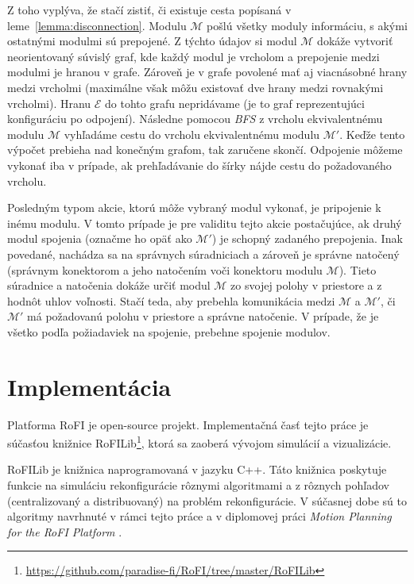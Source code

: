 \documentclass[
  digital, %
  oneside, %
  notable,   %
  lof,     %
  nolot,     %
]{fithesis3}
\begin{document}
Z toho vyplýva, že stačí zistiť, či existuje cesta popísaná v leme~\ref{lemma:disconnection}. Modulu $\mathcal{M}$ pošlú všetky moduly informáciu, s akými ostatnými modulmi sú prepojené. Z týchto údajov si modul $\mathcal{M}$ dokáže vytvoriť neorientovaný súvislý graf, kde každý modul je vrcholom a prepojenie medzi modulmi je hranou v grafe. Zároveň je v grafe povolené mať aj viacnásobné hrany medzi vrcholmi (maximálne však môžu existovať dve hrany medzi rovnakými vrcholmi). Hranu $\mathcal{E}$ do tohto grafu nepridávame (je to graf reprezentujúci konfiguráciu po odpojení). Následne pomocou \textit{BFS} z vrcholu ekvivalentnému modulu $\mathcal{M}$ vyhľadáme cestu do vrcholu ekvivalentnému modulu $\mathcal{M}'$. Keďže tento výpočet prebieha nad konečným grafom, tak zaručene skončí. Odpojenie môžeme vykonať iba v prípade, ak prehľadávanie do šírky nájde cestu do požadovaného vrcholu. 

Posledným typom akcie, ktorú môže vybraný modul vykonať, je pripojenie k inému modulu. V tomto prípade je pre validitu tejto akcie postačujúce, ak druhý modul spojenia (označme ho opäť ako $\mathcal{M}'$) je schopný zadaného prepojenia. Inak povedané, nachádza sa na správnych súradniciach a zároveň je správne natočený (správnym konektorom a jeho natočením voči konektoru modulu $\mathcal{M}$). Tieto súradnice a natočenia dokáže určiť modul $\mathcal{M}$ zo svojej polohy v priestore a z hodnôt uhlov voľnosti. Stačí teda, aby prebehla komunikácia medzi $\mathcal{M}$ a $\mathcal{M}'$, či $\mathcal{M}'$ má požadovanú polohu v priestore a správne natočenie. V prípade, že je všetko podľa požiadaviek na spojenie, prebehne spojenie modulov. 





\chapter{Implementácia}
\label{sec:implementation}
Platforma RoFI je open-source projekt. Implementačná časť tejto práce je súčasťou knižnice RoFILib\footnote{\url{https://github.com/paradise-fi/RoFI/tree/master/RoFILib}}, ktorá sa zaoberá vývojom simulácií a vizualizácie. 

RoFILib je knižnica naprogramovaná v jazyku C++. Táto knižnica poskytuje funkcie na simuláciu rekonfigurácie rôznymi algoritmami a z rôznych pohľadov (centralizovaný a distribuovaný) na problém rekonfigurácie. V súčasnej dobe sú to algoritmy navrhnuté v rámci tejto práce a v diplomovej práci \textit{Motion Planning for the RoFI Platform} \cite{vozarovaMasterThesis}.
\end{document}
